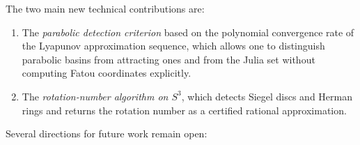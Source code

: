 \documentclass[12pt]{article}
\theoremstyle{definition}
\begin{document}
The two main new technical contributions are:
\begin{enumerate}[label=(\arabic*)]
  \item The \emph{parabolic detection criterion} based on the polynomial
        convergence rate of the Lyapunov approximation sequence, which
        allows one to distinguish parabolic basins from attracting ones
        and from the Julia set without computing Fatou coordinates
        explicitly.
  \item The \emph{rotation-number algorithm on $S^3$}, which detects
        Siegel discs and Herman rings and returns the rotation number as
        a certified rational approximation.
\end{enumerate}

Several directions for future work remain open:
\end{document}
